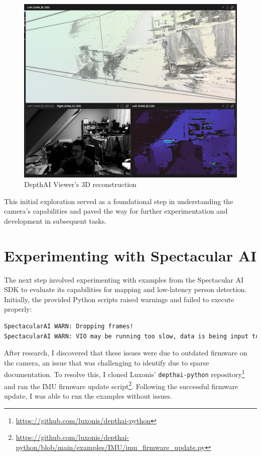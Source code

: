 \begin{figure}[htbp]
	\centering
	\includegraphics[width=150mm, keepaspectratio]{figures/depthai_viewer_3d.png}
	\caption{DepthAI Viewer's 3D reconstruction}
	\label{fig:DAI_3d}
\end{figure}
\FloatBarrier

This initial exploration served as a foundational step in understanding the camera's capabilities and paved the way for further experimentation and development in subsequent tasks.


\section{Experimenting with Spectacular AI} \label{experiments_spai}

The next step involved experimenting with examples from the Spectacular AI SDK to evaluate its capabilities for mapping and low-latency person detection. Initially, the provided Python scripts raised warnings and failed to execute properly:

\FloatBarrier
\begin{lstlisting}[language=bash,frame=single,float=h]
SpectacularAI WARN: Dropping frames!
SpectacularAI WARN: VIO may be running too slow, data is being input too fast, or IMU samples are missing / time-offset from frames. (buffer size 10)
\end{lstlisting}
\FloatBarrier

After research, I discovered that these issues were due to outdated firmware on the camera, an issue that was challenging to identify due to sparse documentation. To resolve this, I cloned Luxonis' \verb|depthai-python| repository\footnote{\url{https://github.com/luxonis/depthai-python}} and ran the IMU firmware update script\footnote{\url{https://github.com/luxonis/depthai-python/blob/main/examples/IMU/imu_firmware_update.py}}. Following the successful firmware update, I was able to run the examples without issues.

